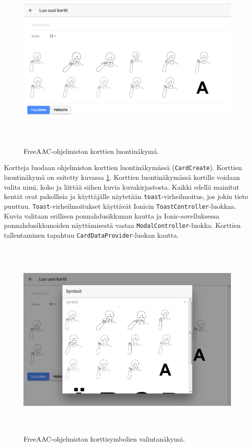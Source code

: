 \documentclass[utf8]{gradu3}
\begin{document}
\begin{figure}[h]\centering
  \includegraphics[height=9cm,keepaspectratio]{card-create-layout}
  \caption[FreeAAC-ohjelmiston korttien luontinäkymä.]
  {FreeAAC-ohjelmiston korttien luontinäkymä.}
  \label{fig:card-create-layout}
\end{figure}

Kortteja luodaan ohjelmiston korttien luontinäkymässä (\texttt{CardCreate}). Korttien luontinäkymä on esitetty kuvassa \ref{fig:card-create-layout}. Korttien luontinäkymässä kortille voidaan valita nimi, koko ja liittää siihen kuvia kuvakirjastosta. Kaikki edellä mainitut kentät ovat pakollisia ja käyttäjälle näytetään \texttt{toast}-virheilmoitus, jos jokin tieto puuttuu. \texttt{Toast}-virheilmoitukset käyttävät Ionicin \texttt{ToastController}-luokkaa. Kuvia valitaan erillisen ponnahdusikkunan kautta ja Ionic-sovelluksessa ponnahdusikkunoiden näyttämisestä vastaa \texttt{ModalController}-luokka. Korttien tallentaminen tapahtuu \texttt{CardDataProvider}-luokan kautta.

\begin{figure}[h]\centering
  \includegraphics[height=10cm,keepaspectratio]{select-symbol-modal-layout}
  \caption[FreeAAC-ohjelmiston korttisymbolien valintanäkymä.]
  {FreeAAC-ohjelmiston korttisymbolien valintanäkymä.}
  \label{fig:select-symbol-modal-layout}
\end{figure}
\end{document}
